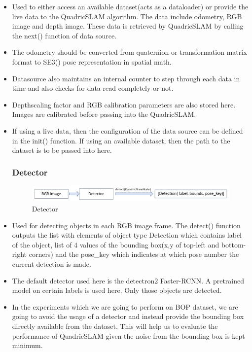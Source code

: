 \documentclass{article}
\begin{document}
\begin{itemize}
\item Used to either access an available dataset(acts as a dataloader) or provide the live data to the QuadricSLAM algorithm. The data include odometry, RGB image and depth image. These data is retrieved by QuadricSLAM by calling the next() function of data source.
\item The odometry should be converted from quaternion or transformation matrix format to SE3() pose representation in spatial math.
\item Datasource also maintains an internal counter to step through each data in time and also checks for data read completely or not.
\item Depthscaling factor and RGB calibration parameters are also stored here. Images are calibrated before passing into the QuadricSLAM.
\item If using a live data, then the configuration of the data source can be defined in the init() function. If using an available dataset, then the path to the dataset is to be passed into here.

\subsubsection{Detector}
\begin{figure}[H]
\centering
\includegraphics[width=\textwidth] {Images/Detector.jpeg}
\caption{\centering Detector}
\label{fig:detector}
\end{figure}

\item Used for detecting objects in each RGB image frame. The detect() function outputs the list with elements of object type Detection which contains label of the object, list of 4 values of the bounding box(x,y of top-left and bottom-right corners) and the pose\_key which indicates at which pose number the current detection is made.
\item The default detector used here is the detectron2 Faster-RCNN. A pretrained model on certain labels is used here. Only those objects are detected.
\item In the experiments which we are going to perform on BOP dataset, we are going to avoid the usage of a detector and instead provide the bounding box directly available from the dataset. This will help us to evaluate the performance of QuadricSLAM given the noise from the bounding box is kept minimum.


\end{itemize}
\end{document}
